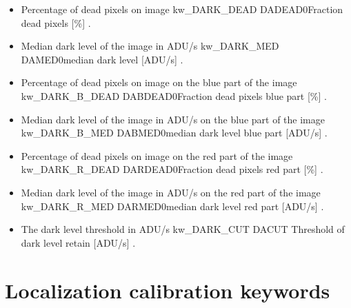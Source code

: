\begin{itemize}

\item {}
{Percentage of dead pixels on image}
{kw\_DARK\_DEAD}
{DADEAD}{0}{Fraction dead pixels [\%]}
{\calDARK}{\spirouKeywords}{\calDARK.\progMAIN}

\item {}
{Median dark level of the image in ADU/s}
{kw\_DARK\_MED}
{DAMED}{0}{median dark level [ADU/s]}
{\calDARK}{\spirouKeywords}{\calDARK.\progMAIN}

\item {}
{Percentage of dead pixels on image on the blue part of the image}
{kw\_DARK\_B\_DEAD}
{DABDEAD}{0}{Fraction dead pixels blue part [\%]}
{\calDARK}{\spirouKeywords}{\calDARK.\progMAIN}

\item {}
{Median dark level of the image in ADU/s on the blue part of the image}
{kw\_DARK\_B\_MED}
{DABMED}{0}{median dark level blue part [ADU/s]}
{\calDARK}{\spirouKeywords}{\calDARK.\progMAIN}

\item {}
{Percentage of dead pixels on image on the red part of the image}
{kw\_DARK\_R\_DEAD}
{DARDEAD}{0}{Fraction dead pixels red part [\%]}
{\calDARK}{\spirouKeywords}{\calDARK.\progMAIN}

\item {}
{Median dark level of the image in ADU/s on the red part of the image}
{kw\_DARK\_R\_MED}
{DARMED}{0}{median dark level red part [ADU/s]}
{\calDARK}{\spirouKeywords}{\calDARK.\progMAIN}
\item {}
{The dark level threshold in ADU/s}
{kw\_DARK\_CUT}
{DACUT}{}
{Threshold of dark level retain [ADU/s]}
{\calDARK}{\spirouKeywords}{\calDARK.\progMAIN}

\end{itemize}




\clearpage
\newpage
\section{Localization calibration keywords}
\label{ch:output_keywords:localization}

